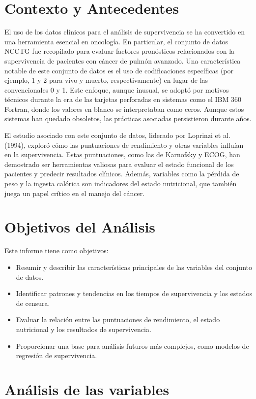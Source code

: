 \documentclass[a4paper,12pt]{article}
\begin{document}
	\section*{Contexto y Antecedentes}
	El uso de los datos clínicos para el análisis de supervivencia se ha convertido en una herramienta esencial en oncología. En particular, el conjunto de datos NCCTG fue recopilado para evaluar factores pronósticos relacionados con la supervivencia de pacientes con cáncer de pulmón avanzado. Una característica notable de este conjunto de datos es el uso de codificaciones específicas (por ejemplo, 1 y 2 para vivo y muerto, respectivamente) en lugar de las convencionales 0 y 1. Este enfoque, aunque inusual, se adoptó por motivos técnicos durante la era de las tarjetas perforadas en sistemas como el IBM 360 Fortran, donde los valores en blanco se interpretaban como ceros. Aunque estos sistemas han quedado obsoletos, las prácticas asociadas persistieron durante años.
	
	El estudio asociado con este conjunto de datos, liderado por Loprinzi et al. (1994), exploró cómo las puntuaciones de rendimiento y otras variables influían en la supervivencia. Estas puntuaciones, como las de Karnofsky y ECOG, han demostrado ser herramientas valiosas para evaluar el estado funcional de los pacientes y predecir resultados clínicos. Además, variables como la pérdida de peso y la ingesta calórica son indicadores del estado nutricional, que también juega un papel crítico en el manejo del cáncer.
	
	\section*{Objetivos del Análisis}
	Este informe tiene como objetivos:
	\begin{itemize}
		\item Resumir y describir las características principales de las variables del conjunto de datos.
		\item Identificar patrones y tendencias en los tiempos de supervivencia y los estados de censura.
		\item Evaluar la relación entre las puntuaciones de rendimiento, el estado nutricional y los resultados de supervivencia.
		\item Proporcionar una base para análisis futuros más complejos, como modelos de regresión de supervivencia.
	\end{itemize}
	
	\section*{Análisis de las variables}
\end{document}

